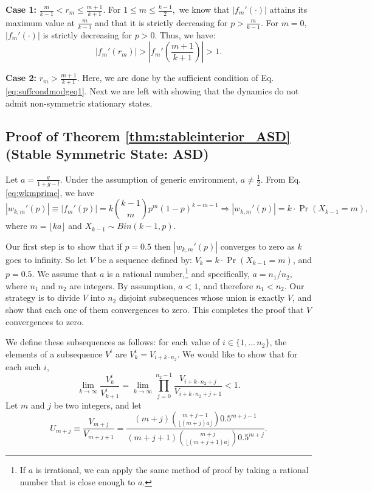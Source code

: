 \documentclass[12pt]{article}
\numberwithin{equation}{section}
\numberwithin{figure}{section}
\theoremstyle{definition}
\theoremstyle{plain}
\theoremstyle{plain}
\theoremstyle{plain}
\theoremstyle{remark}
\theoremstyle{plain}
\theoremstyle{plain}
\begin{document}
\textbf{Case 1:} $\frac{m}{k-1} < r_m \leq \frac{m+1}{k+1}$. 
For $1\leq m \leq \frac{k-1}{2},$ we know that $|f_m'(\cdot)|$ attains its maximum value at $\frac{m}{k-1}$ and that it is strictly decreasing for $p > \frac{m}{k-1}.$ For $m=0,$ $|f_m'(\cdot)|$ is strictly decreasing for $p>0.$ Thus, we have:
\[
|f_m'(r_m)| > \left|f_m'\left(\frac{m+1}{k+1} \right)\right| > 1.
\]

\textbf{Case 2:} $r_m > \frac{m+1}{k+1}.$ Here, we are done by the sufficient condition of Eq. \eqref{eq:suffcondmodgeq1}.
Next we are left with showing that the dynamics do not admit non-symmetric stationary states.

\subsection{Proof of Theorem \ref{thm:stableinterior_ASD} (Stable Symmetric State: ASD)}\label{subsec:stableinterior_ASDproof}
Let $a = \frac{g}{1+g-l}.$ Under the assumption of generic environment, $a \neq \frac{1}{2}.$ From Eq. \eqref{eq:wkmprime}, we have
\[
|w_{k,m}'(p)|\equiv|f_m'(p)|=k\binom{k-1}{m}p^{m}(1-p)^{k-m-1}\Rightarrow|w_{k,m}'(p)|=k\cdot\Pr\left(X_{k-1}=m\right),
\]
where $m = \lfloor ka\rfloor$ and $X_{k-1}\sim Bin\left(k-1,p\right).$ 

Our first step is to show that if $p=0.5$ then $|w_{k,m}'(p)|$ converges to zero as $k$ goes to infinity. So let $V$ be a sequence defined by: $V_k=k\cdot\Pr\left(X_{k-1}=m\right)$, and $p=0.5$. We assume that $a$ is a rational number,\footnote{If $a$ is irrational, we can apply the same method of proof by taking a rational number that is close enough to $a$.} and specifically, $a=n_1/n_2$, where $n_1$ and $n_2$ are integers. By assumption, $a<1$, and therefore $n_1<n_2$. Our strategy is to divide $V$ into $n_2$ disjoint subsequences whose union is exactly $V$, and show that each one of them convergences to zero. This completes the proof that $V$ convergences to zero.

We define these subsequences as follows: for each value of $i\in \{1,...\,n_2\}$, the elements of a subsequence $V^i$ are $V^i_k=V_{i+k\cdot n_2}$. We would like to show that for each such $i$,
\[
\lim_{k\rightarrow\infty}\frac{V^i_k}{V^i_{k+1}}=\lim_{k\rightarrow\infty}\prod_{j=0}^{n_2-1}\frac{V_{i+k\cdot n_2+j}}{V_{i+k\cdot n_2+j+1}}< 1.
\]
Let $m$ and $j$ be two integers, and let
\[
U_{m+j}\equiv \frac{V_{m+j}}{V_{m+j+1}}=\frac{(m+j)\binom{m+j-1}{\lfloor(m+j)a\rfloor}0.5^{m+j-1}}{(m+j+1)\binom{m+j}{\lfloor(m+j+1)a\rfloor}0.5^{m+j}}.
\]
\end{document}
